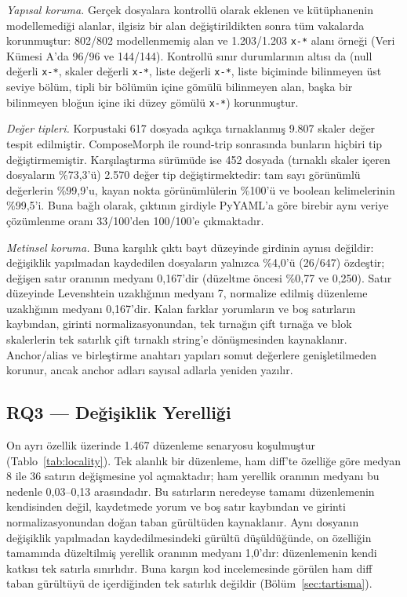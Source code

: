 \documentclass[conference]{IEEEtran}
\begin{document}
\emph{Yapısal koruma.} Gerçek dosyalara kontrollü olarak eklenen ve
kütüphanenin modellemediği alanlar, ilgisiz bir alan değiştirildikten
sonra tüm vakalarda korunmuştur: 802/802 modellenmemiş alan ve
1.203/1.203 \texttt{x-*} alanı örneği (Veri Kümesi A'da 96/96 ve
144/144). Kontrollü sınır durumlarının altısı da (null değerli
\texttt{x-*}, skaler değerli \texttt{x-*}, liste değerli \texttt{x-*},
liste biçiminde bilinmeyen üst seviye bölüm, tipli bir bölümün içine
gömülü bilinmeyen alan, başka bir bilinmeyen bloğun içine iki düzey
gömülü \texttt{x-*}) korunmuştur.

\emph{Değer tipleri.} Korpustaki 617 dosyada açıkça tırnaklanmış 9.807
skaler değer tespit edilmiştir. ComposeMorph ile round-trip sonrasında
bunların hiçbiri tip değiştirmemiştir. Karşılaştırma sürümüde ise 452 dosyada
(tırnaklı skaler içeren dosyaların \%73,3'ü) 2.570 değer tip
değiştirmektedir: tam sayı görünümlü değerlerin \%99,9'u, kayan nokta
görünümlülerin \%100'ü ve boolean kelimelerinin \%99,5'i. Buna bağlı
olarak, çıktının girdiyle PyYAML'a göre birebir aynı veriye çözümlenme
oranı 33/100'den 100/100'e çıkmaktadır.

\emph{Metinsel koruma.} Buna karşılık çıktı bayt düzeyinde girdinin aynısı
değildir: değişiklik yapılmadan kaydedilen dosyaların yalnızca \%4,0'ü
(26/647) özdeştir; değişen satır oranının medyanı 0,167'dir (düzeltme
öncesi \%0,77 ve 0,250). Satır düzeyinde Levenshtein uzaklığının medyanı
7, normalize edilmiş düzenleme uzaklığının medyanı 0,167'dir. Kalan farklar
yorumların ve boş satırların kaybından, girinti normalizasyonundan, tek
tırnağın çift tırnağa ve blok skalerlerin tek satırlık çift tırnaklı
string'e dönüşmesinden kaynaklanır. Anchor/alias ve birleştirme anahtarı yapıları
somut değerlere genişletilmeden korunur, ancak anchor adları sayısal
adlarla yeniden yazılır.

\subsection{RQ3 --- Değişiklik Yerelliği}
On ayrı özellik üzerinde 1.467 düzenleme senaryosu koşulmuştur
(Tablo~\ref{tab:locality}). Tek alanlık bir düzenleme, ham diff'te
özelliğe göre medyan 8 ile 36 satırın değişmesine yol açmaktadır; ham
yerellik oranının medyanı bu nedenle 0,03--0,13 arasındadır. Bu satırların
neredeyse tamamı düzenlemenin kendisinden değil, kaydetmede yorum ve boş
satır kaybından ve girinti normalizasyonundan doğan taban gürültüden
kaynaklanır. Aynı dosyanın değişiklik yapılmadan kaydedilmesindeki gürültü
düşüldüğünde, on özelliğin tamamında düzeltilmiş yerellik oranının medyanı
1,0'dır: düzenlemenin kendi katkısı tek satırla sınırlıdır. Buna karşın kod
incelemesinde görülen ham diff taban gürültüyü de içerdiğinden tek
satırlık değildir (Bölüm~\ref{sec:tartisma}).
\end{document}
